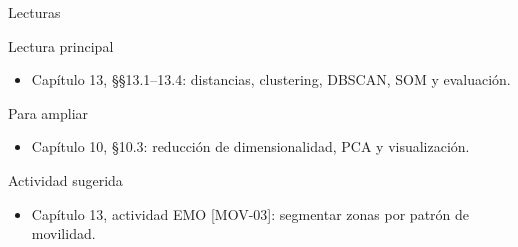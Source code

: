 \documentclass[aspectratio=169,10pt]{beamer}
\begin{document}
\begin{frame}{Lecturas}
  \small
  \begin{block}{Lectura principal}
    \begin{itemize}
      \item Capítulo 13, §§13.1--13.4: distancias, clustering, DBSCAN, SOM y evaluación.
    \end{itemize}
  \end{block}
  \begin{block}{Para ampliar}
    \begin{itemize}
      \item Capítulo 10, §10.3: reducción de dimensionalidad, PCA y visualización.
    \end{itemize}
  \end{block}
  \begin{block}{Actividad sugerida}
    \begin{itemize}
      \item Capítulo 13, actividad EMO [MOV-03]: segmentar zonas por patrón de movilidad.
    \end{itemize}
  \end{block}
\end{frame}
\end{document}
